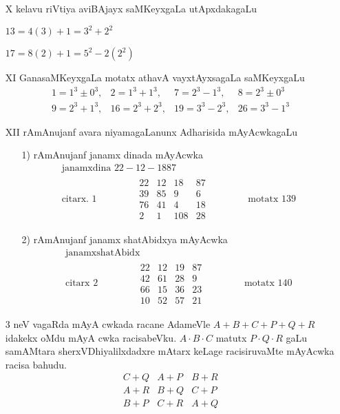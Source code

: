 \begin{enumerate}
\item[{\rm X}] kelavu riVtiya aviBAjayx saMKeyxgaLa utApxdakagaLu

$13=4(3)+1 = 3^{2}+2^{2}$

$17=8(2)+1 = 5^{2}-2(2^{2})$

\item[{\rm XI}] GanasaMKeyxgaLa motatx athavA vayxtAyxsagaLa saMKeyxgaLu
$$
\begin{matrix}
1=1^3\pm 0^3, & 2=1^3+1^3, & 7= 2^3-1^3, & 8= 2^3\pm 0^3\\
9=2^3+1^3, & 16=2^3+2^3, & 19=3^3-2^3, & 26=3^3-1^3 
\end{matrix}
$$
\item[{\rm XII}] rAmAnujanf avara niyamagaLanunx Adharisida mAyAcwkagaLu
\begin{itemize}
\item[{\rm 1)}] rAmAnujanf janamx dinada mAyAcwka
\begin{gather*}
\text{janamxdina } 22-12-1887\\
\text{citarx. }  1 \qquad \qquad 
\begin{matrix}
22 & 12 & 18 & 87\\
39 & 85 & 9 & 6\\
76 & 41 & 4 & 18\\
2 & 1 & 108 & 28
\end{matrix} \qquad \qquad
\text{motatx } 139
\end{gather*}

\newpage
\item[{\rm 2)}] rAmAnujanf janamx shatAbidxya mAyAcwka
\begin{gather*}
\text{janamxshatAbidx }\\
\text{citarx } 2 \qquad \qquad 
\begin{matrix}
22 & 12 & 19 & 87\\
42 & 61 & 28 & 9\\
66 & 15 & 36 & 23\\
10 & 52 & 57 & 21
\end{matrix} \qquad \qquad 
\text{motatx } 140
\end{gather*}
\end{itemize}

{\rm 3} neV vagaRda mAyA cwkada racane AdameVle $A+B+C+P+Q+R$ idakekx oMdu mAyA cwka racisabeVku. $A\cdot B\cdot C$ matutx $P\cdot Q\cdot R$ gaLu samAMtara sherxVDhiyalilxdadxre mAtarx keLage racisiruvaMte mAyAcwka racisa bahudu.
$$
\begin{matrix}
C+Q & A+P & B+R\\
A+R & B+Q & C+P\\
B+P & C+R & A+Q
\end{matrix}
$$
 

\end{enumerate}
